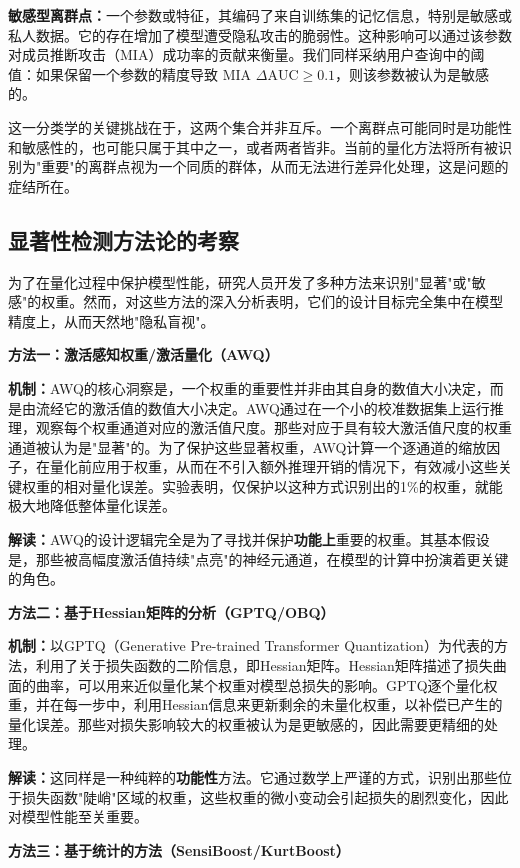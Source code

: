 \documentclass[letterpaper,twocolumn,10pt]{article}
\begin{document}
\textbf{敏感型离群点：}一个参数或特征，其编码了来自训练集的记忆信息，特别是敏感或私人数据。它的存在增加了模型遭受隐私攻击的脆弱性。这种影响可以通过该参数对成员推断攻击（MIA）成功率的贡献来衡量。我们同样采纳用户查询中的阈值：如果保留一个参数的精度导致 MIA $\Delta \text{AUC} \geq 0.1$，则该参数被认为是敏感的。

这一分类学的关键挑战在于，这两个集合并非互斥。一个离群点可能同时是功能性和敏感性的，也可能只属于其中之一，或者两者皆非。当前的量化方法将所有被识别为"重要"的离群点视为一个同质的群体，从而无法进行差异化处理，这是问题的症结所在。

\subsection{显著性检测方法论的考察}

为了在量化过程中保护模型性能，研究人员开发了多种方法来识别"显著"或"敏感"的权重。然而，对这些方法的深入分析表明，它们的设计目标完全集中在模型精度上，从而天然地"隐私盲视"。

\textbf{方法一：激活感知权重/激活量化（AWQ）}

\textbf{机制：}AWQ的核心洞察是，一个权重的重要性并非由其自身的数值大小决定，而是由流经它的激活值的数值大小决定。AWQ通过在一个小的校准数据集上运行推理，观察每个权重通道对应的激活值尺度。那些对应于具有较大激活值尺度的权重通道被认为是"显著"的。为了保护这些显著权重，AWQ计算一个逐通道的缩放因子，在量化前应用于权重，从而在不引入额外推理开销的情况下，有效减小这些关键权重的相对量化误差。实验表明，仅保护以这种方式识别出的1\%的权重，就能极大地降低整体量化误差。

\textbf{解读：}AWQ的设计逻辑完全是为了寻找并保护\textbf{功能上}重要的权重。其基本假设是，那些被高幅度激活值持续"点亮"的神经元通道，在模型的计算中扮演着更关键的角色。

\textbf{方法二：基于Hessian矩阵的分析（GPTQ/OBQ）}

\textbf{机制：}以GPTQ（Generative Pre-trained Transformer Quantization）为代表的方法，利用了关于损失函数的二阶信息，即Hessian矩阵。Hessian矩阵描述了损失曲面的曲率，可以用来近似量化某个权重对模型总损失的影响。GPTQ逐个量化权重，并在每一步中，利用Hessian信息来更新剩余的未量化权重，以补偿已产生的量化误差。那些对损失影响较大的权重被认为是更敏感的，因此需要更精细的处理。

\textbf{解读：}这同样是一种纯粹的\textbf{功能性}方法。它通过数学上严谨的方式，识别出那些位于损失函数"陡峭"区域的权重，这些权重的微小变动会引起损失的剧烈变化，因此对模型性能至关重要。

\textbf{方法三：基于统计的方法（SensiBoost/KurtBoost）}
\end{document}
